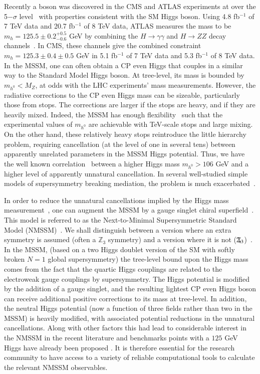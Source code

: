 \documentclass[final,3p,times,pdflatex]{elsarticle}
\newcommand{\Zv}{\,\mathbf{\backslash}\mkern-11.0mu{\mathbb{Z}}_{3}} %
\begin{document}
Recently a boson was discovered in the CMS and 
ATLAS experiments at over the 5$-\sigma$
level~\cite{Aad:2012tfa,Chatrchyan:2012ufa} with properties consistent
with the SM Higgs boson. Using 4.8 fb$^{-1}$ of 7 TeV data and 20.7
fb$^{-1}$ of 8 TeV data, ATLAS measures the mass to be
$m_h=125.5\pm0.2^{+0.5}_{-0.6}$ GeV by combining the $H \rightarrow \gamma
\gamma$ and $H \rightarrow ZZ$ decay channels~\cite{ATLAS-CONF-2013-014}.
In CMS, these channels give the combined constraint $m_h=125.3 \pm0.4 \pm0.5$
GeV in 5.1 fb$^{-1}$ of 7 TeV data and 5.3 fb$^{-1}$ of 8 TeV data. 
In the MSSM, one can often obtain a CP even Higgs that couples in a similar
way to the Standard Model Higgs boson. At tree-level, its mass is bounded by
$m_{h^0} < M_Z$, at odds with the LHC experiments' mass measurements. 
However,
the radiative corrections to the CP even Higgs mass can be sizeable,
particularly those from stops. The corrections are larger if the stops are
heavy, and if they are heavily mixed. Indeed, the MSSM has enough
flexibility~\cite{Djouadi:2013lra} such that the experimental values of
$m_{h^0}$ are achievable with TeV-scale stops and large mixing. On the other
hand, these relatively heavy stops reintroduce the little hierarchy problem,
requiring cancellation (at the level of one in several tens) 
between apparently unrelated parameters in the MSSM Higgs potential. 
Thus, we have the well known correlation~\cite{Barbieri:1998uv} between a
higher Higgs mass $m_{h^0}>106$ GeV and a higher level of apparently unnatural
cancellation. In several
well-studied simple models of supersymmetry breaking mediation, the
problem is much exacerbated~\cite{Arbey:2011ab}. 

In order to reduce the unnatural cancellations implied by the Higgs mass
measurement~\cite{Delgado:2010uj,Ellwanger:2011mu,King:2012tr,Perelstein:2012qg,Gherghetta:2012gb}, 
one can augment the MSSM by a gauge singlet chiral
superfield~\cite{BasteroGil:2000bw,Ellwanger:2009dp,Maniatis:2009re}. This model is referred to as the 
Next-to-Minimal 
Supersymmetric Standard Model (NMSSM)~\cite{NMSSM}. We shall distinguish
between a 
version where an extra symmetry is assumed (often a $\mathbb{Z}_3$ symmetry) 
and a version where it is not
($\Zv$)~\cite{Delgado:2010uj,Ell08,Ross:2011xv,Ross:2012nr}. 
In the MSSM, (based on a two Higgs doublet version of the SM with
softly broken $N=1$ global supersymmetry)
the tree-level bound upon the Higgs mass comes from the fact that 
the quartic Higgs couplings are related to the electroweak gauge couplings by
supersymmetry. The Higgs potential is modified by the addition of a gauge
singlet, and the resulting lightest CP even Higgs boson can receive additional
positive corrections to its mass at tree-level. In addition, the neutral Higgs
potential (now a function of three fields rather than two in the MSSM) is
heavily modified, with associated potential reductions in the unnatural
cancellations. Along with other factors this had lead to considerable interest in the NMSSM
in the recent literature and benchmarks points with a $125$ GeV Higgs have already been proposed \cite{King:2012is}.
It is therefore essential for the research community
to have access to a variety of reliable computational tools to calculate the relevant NMSSM observables. 
\end{document}
